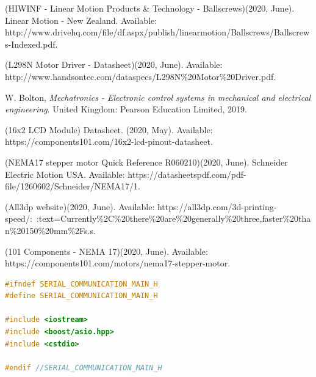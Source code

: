 \documentclass[transmag]{IEEEtran}
\begin{document}
\begin{thebibliography}{00}


 (HIWINF - Linear Motion Products \& Technology - Ballscrews)(2020, June). Linear Motion - New Zealand. Available: http://www.drivehq.com/file/df.aspx/publish/linearmotion/Ballscrews/Ballscrews-Indexed.pdf. 

 (L298N Motor Driver - Datasheet)(2020, June). Available:  http://www.handsontec.com/dataspecs/L298N\%20Motor\%20Driver.pdf.

 W. Bolton, \emph{Mechatronics - Electronic control systems in mechanical and electrical engineering}. United Kingdom: Pearson Education Limited, 2019.

 (16x2 LCD Module) Datasheet. (2020, May).  Available: https://components101.com/16x2-lcd-pinout-datasheet.


 (NEMA17 stepper motor Quick Reference R060210)(2020, June). Schneider Electric Motion USA. Available: https://datasheetspdf.com/pdf-file/1260602/Schneider/NEMA17/1. 

 (All3dp website)(2020, June). Available: https://all3dp.com/3d-printing-speed/:~:text=Currently\%2C\%20there\%20are\%20generally\%20three,faster\%20than\%20150\%20mm\%2Fs.s.

 (101 Components - NEMA 17)(2020, June). Available: https://components101.com/motors/nema17-stepper-motor.



\end{thebibliography}

\clearpage
\newpage

\onecolumn

\appendix


\begin{lstlisting}[language=C++, caption=PC controller program - Serial Communication - Header file]
#ifndef SERIAL_COMMUNICATION_MAIN_H
#define SERIAL_COMMUNICATION_MAIN_H

#include <iostream>
#include <boost/asio.hpp>
#include <cstdio>

#endif //SERIAL_COMMUNICATION_MAIN_H
\end{lstlisting}
\end{document}
